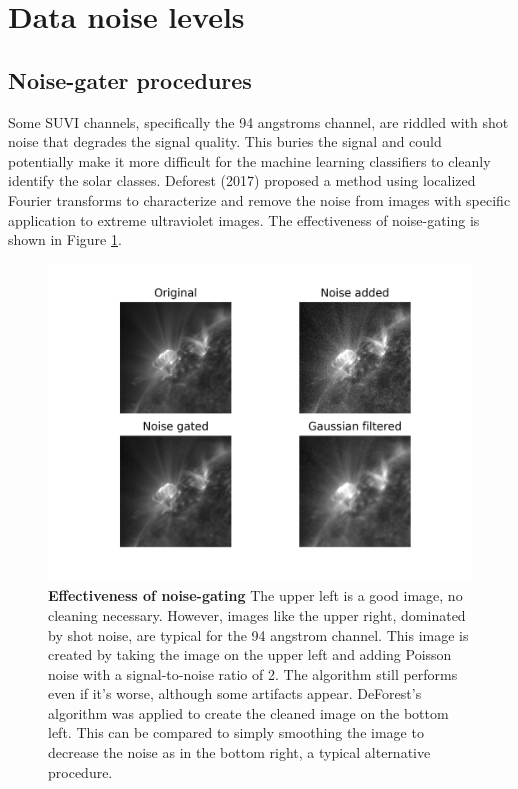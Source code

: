 \documentclass[twoside]{report}
\begin{document}
\section{Data noise levels}

\subsection{Noise-gater procedures}
Some SUVI channels, specifically the 94 angstroms channel, are riddled with shot noise that degrades the signal quality. This buries the signal and could potentially make it more difficult for the machine learning classifiers to cleanly identify the solar classes. Deforest (2017) proposed a method using localized Fourier transforms to characterize and remove the noise from images with specific application to extreme ultraviolet images. The effectiveness of noise-gating is shown in Figure \ref{fig:noise-gate-example}.


\begin{figure}[ht]
  \begin{center}
    \includegraphics[scale=0.8]{noise-gate.png}
    \caption{{\bf Effectiveness of noise-gating} The upper left is a good image, no cleaning necessary. However, images like the upper right, dominated by shot noise, are typical for the 94 angstrom channel. This image is created by taking the image on the upper left and adding Poisson noise with a signal-to-noise ratio of 2. The algorithm still performs even if it's worse, although some artifacts appear. DeForest's algorithm was applied to create the cleaned image on the bottom left. This can be compared to simply smoothing the image to decrease the noise as in the bottom right, a typical alternative procedure.}
    \label{fig:noise-gate-example}
 \end{center}
\end{figure}
\end{document}
